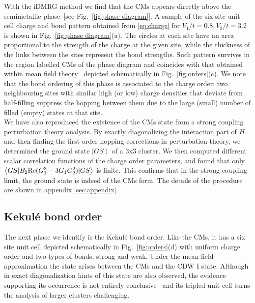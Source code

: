 \documentclass[aps,prx,10pt,twocolumn,floatfix,superscriptaddress,showpacs,numerical,footinbib]{revtex4-1}
\begin{document}
%
With the iDMRG method we find that the CMs appears directly above the semimetallic phase~[see Fig.~\ref{fig:phase diagram}].
%
A sample of the six site unit cell charge and bond pattern obtained from \eqref{eq:charge} for $V_1/t = 0.8, V_2/t = 3.2 $ is shown in Fig.~\ref{fig:phase diagram}(a).
%
The circles at each site have an area proportional to the strength of the charge at the given site, while the thickness of the links between the sites
represent the bond strengths.
%
Such pattern survives in the region labelled CMs of the phase diagram and coincides with that obtained within mean field theory~\cite{GCC13} 
depicted schematically in Fig.~\ref{fig:orders}(c).
%
We note that the bond ordering of this phase is associated to the charge order: two neighbouring sites with similar high (or low) charge densities
that deviate from half-filling suppress the hopping between them due to the large (small) number of filled (empty) states at that site. \\
% 
We have also reproduced the existence of the CMs state from a strong coupling perturbation theory analysis. 
%
By exactly diagonalizing the interaction part of $H$ and then finding the first order hopping corrections in perturbation theory, 
we determined the ground state $\left.|GS\right>$ of a 3x3 cluster. 
%
We then computed different scalar correlation functions of the charge order parameters, and found that only $\left<GS|B_2 {\rm Re}(G_1^3-3G_1G_2^2)|GS\right>$ is finite. 
%
This confirms that in the strong coupling limit, the ground state is indeed of the CMs form. The details of the procedure are shown in appendix \ref{sec:appendix}. 
%

\subsection{Kekul\'{e} bond order}
%
The next phase we identify is the Kekul\'{e}
bond order.
%
Like the CMs, it has a six site unit cell depicted schematically in Fig.~\ref{fig:orders}(d)
with uniform charge order and two types of bonds, strong and weak.
%
Under the mean field approximation the state arises between the CMs and the CDW I state.
%
Although in exact diagonalization hints of this state are also observed,
the evidence supporting its occurrence is not entirely conclusive~\cite{GGNVC13} and
its tripled unit cell turns the analysis of larger clusters challenging.
%
\end{document}
